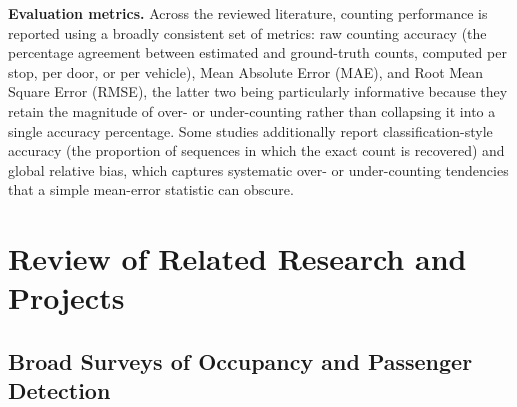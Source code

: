 \documentclass[12pt,a4paper]{report}
\begin{document}
\textbf{Evaluation metrics.} Across the reviewed literature, counting performance is reported using a broadly consistent set of metrics: raw counting accuracy (the percentage agreement between estimated and ground-truth counts, computed per stop, per door, or per vehicle), Mean Absolute Error (MAE), and Root Mean Square Error (RMSE), the latter two being particularly informative because they retain the magnitude of over- or under-counting rather than collapsing it into a single accuracy percentage. Some studies additionally report classification-style accuracy (the proportion of sequences in which the exact count is recovered) and global relative bias, which captures systematic over- or under-counting tendencies that a simple mean-error statistic can obscure.

\section{Review of Related Research and Projects}

\subsection{Broad Surveys of Occupancy and Passenger Detection}
\end{document}
